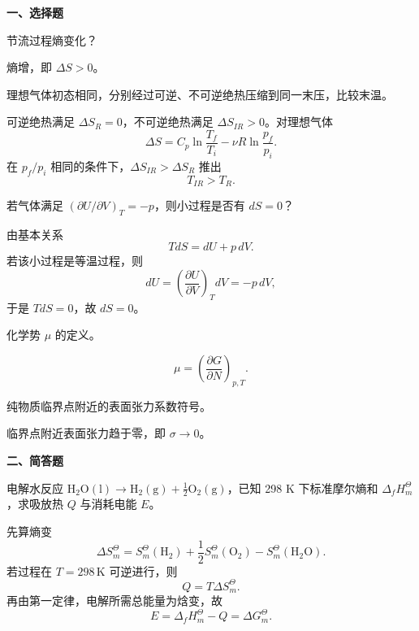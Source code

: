 ﻿

\textbf{一、选择题}
\begin{question}
节流过程熵变化？
\begin{solution}
熵增，即 $\Delta S>0$。
\end{solution}
\end{question}

\begin{question}
理想气体初态相同，分别经过可逆、不可逆绝热压缩到同一末压，比较末温。
\begin{solution}
可逆绝热满足 $\Delta S_R=0$，不可逆绝热满足 $\Delta S_{IR}>0$。对理想气体
\[
\Delta S=C_p\ln\frac{T_f}{T_i}-\nu R\ln\frac{p_f}{p_i}.
\]
在 $p_f/p_i$ 相同的条件下，$\Delta S_{IR}>\Delta S_R$ 推出
\[
T_{IR}>T_R.
\]
\end{solution}
\end{question}

\begin{question}
若气体满足 $\left(\partial U/\partial V\right)_T=-p$，则小过程是否有 $dS=0$？
\begin{solution}
由基本关系
\[
TdS=dU+p\,dV.
\]
若该小过程是等温过程，则
\[
dU=\left(\frac{\partial U}{\partial V}\right)_T dV=-p\,dV,
\]
于是 $TdS=0$，故 $dS=0$。
\end{solution}
\end{question}

\begin{question}
化学势 $\mu$ 的定义。
\begin{solution}
\[
\mu=\left(\frac{\partial G}{\partial N}\right)_{p,T}.
\]
\end{solution}
\end{question}

\begin{question}
纯物质临界点附近的表面张力系数符号。
\begin{solution}
临界点附近表面张力趋于零，即 $\sigma\to 0$。
\end{solution}
\end{question}

\textbf{二、简答题}
\begin{question}
电解水反应 $\mathrm{H_2O(l)}\to \mathrm{H_2(g)}+\tfrac12\mathrm{O_2(g)}$，已知 298 K 下标准摩尔熵和 $\Delta_f H_m^\Theta$，求吸放热 $Q$ 与消耗电能 $E$。
\begin{solution}
先算熵变
\[
\Delta S_m^\Theta=S_m^\Theta(\mathrm{H_2})+\frac12S_m^\Theta(\mathrm{O_2})-S_m^\Theta(\mathrm{H_2O}).
\]
若过程在 $T=298\,\mathrm K$ 可逆进行，则
\[
Q=T\Delta S_m^\Theta.
\]
再由第一定律，电解所需总能量为焓变，故
\[
E=\Delta_f H_m^\Theta-Q=\Delta G_m^\Theta.
\]
\end{solution}
\end{question}

